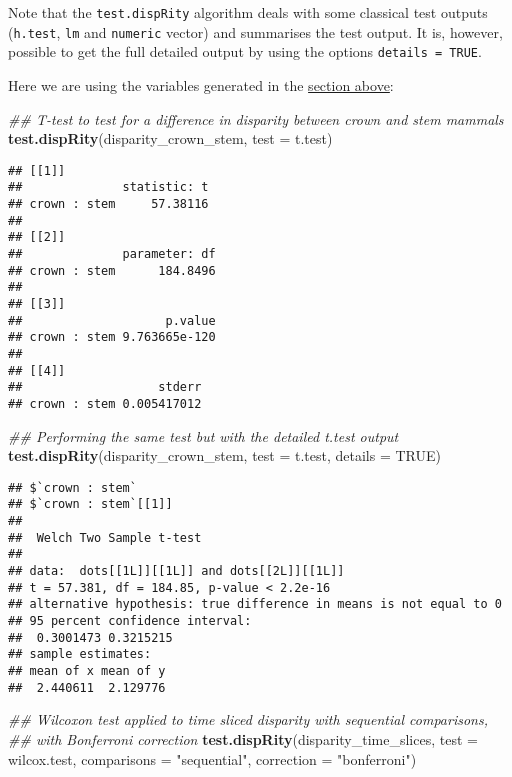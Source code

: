 \documentclass[
]{book}
\newenvironment{Shaded}{\begin{snugshade}}{\end{snugshade}}
\newcommand{\CommentTok}[1]{\textcolor[rgb]{0.56,0.35,0.01}{\textit{#1}}}
\newcommand{\DataTypeTok}[1]{\textcolor[rgb]{0.13,0.29,0.53}{#1}}
\newcommand{\KeywordTok}[1]{\textcolor[rgb]{0.13,0.29,0.53}{\textbf{#1}}}
\newcommand{\NormalTok}[1]{#1}
\newcommand{\OtherTok}[1]{\textcolor[rgb]{0.56,0.35,0.01}{#1}}
\newcommand{\StringTok}[1]{\textcolor[rgb]{0.31,0.60,0.02}{#1}}
\begin{document}
Note that the \texttt{test.dispRity} algorithm deals with some classical test outputs (\texttt{h.test}, \texttt{lm} and \texttt{numeric} vector) and summarises the test output.
It is, however, possible to get the full detailed output by using the options \texttt{details\ =\ TRUE}.

Here we are using the variables generated in the \protect\hyperlink{summarising-dispRity-data-plots}{section above}:

\begin{Shaded}
\begin{Highlighting}[]
\CommentTok{\#\# T{-}test to test for a difference in disparity between crown and stem mammals}
\KeywordTok{test.dispRity}\NormalTok{(disparity\_crown\_stem, }\DataTypeTok{test =}\NormalTok{ t.test)}
\end{Highlighting}
\end{Shaded}

\begin{verbatim}
## [[1]]
##              statistic: t
## crown : stem     57.38116
## 
## [[2]]
##              parameter: df
## crown : stem      184.8496
## 
## [[3]]
##                    p.value
## crown : stem 9.763665e-120
## 
## [[4]]
##                   stderr
## crown : stem 0.005417012
\end{verbatim}

\begin{Shaded}
\begin{Highlighting}[]
\CommentTok{\#\# Performing the same test but with the detailed t.test output}
\KeywordTok{test.dispRity}\NormalTok{(disparity\_crown\_stem, }\DataTypeTok{test =}\NormalTok{ t.test, }\DataTypeTok{details =} \OtherTok{TRUE}\NormalTok{)}
\end{Highlighting}
\end{Shaded}

\begin{verbatim}
## $`crown : stem`
## $`crown : stem`[[1]]
## 
##  Welch Two Sample t-test
## 
## data:  dots[[1L]][[1L]] and dots[[2L]][[1L]]
## t = 57.381, df = 184.85, p-value < 2.2e-16
## alternative hypothesis: true difference in means is not equal to 0
## 95 percent confidence interval:
##  0.3001473 0.3215215
## sample estimates:
## mean of x mean of y 
##  2.440611  2.129776
\end{verbatim}

\begin{Shaded}
\begin{Highlighting}[]
\CommentTok{\#\# Wilcoxon test applied to time sliced disparity with sequential comparisons,}
\CommentTok{\#\# with Bonferroni correction}
\KeywordTok{test.dispRity}\NormalTok{(disparity\_time\_slices, }\DataTypeTok{test =}\NormalTok{ wilcox.test,}
              \DataTypeTok{comparisons =} \StringTok{"sequential"}\NormalTok{, }\DataTypeTok{correction =} \StringTok{"bonferroni"}\NormalTok{)}
\end{Highlighting}
\end{Shaded}
\end{document}
